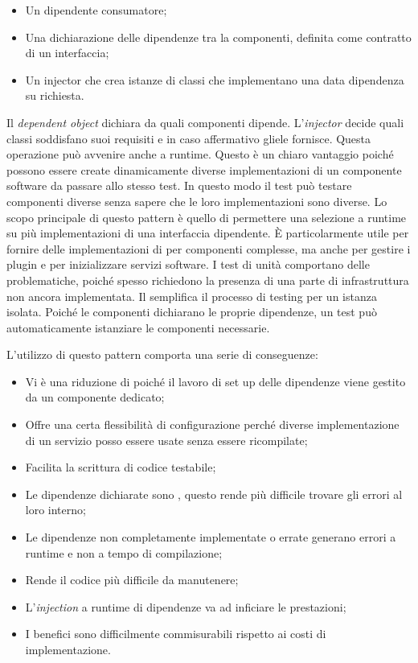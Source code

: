 \begin{itemize}
	\item Un dipendente consumatore;
	\item Una dichiarazione delle dipendenze tra la componenti, definita come contratto di un interfaccia;
	\item Un injector che crea istanze di classi che implementano una data dipendenza su richiesta.

\end{itemize}

Il \textit{dependent object} dichiara da quali componenti dipende. L'\textit{injector} decide quali classi soddisfano suoi requisiti e in caso affermativo gliele fornisce. Questa operazione può avvenire anche a runtime. Questo è un chiaro vantaggio poiché possono essere create dinamicamente diverse implementazioni di un componente software da passare allo stesso test. In questo modo il test può testare componenti diverse senza sapere che le loro implementazioni sono diverse.
Lo scopo principale di questo pattern è quello di permettere una selezione a runtime su più implementazioni di una interfaccia dipendente. È particolarmente utile per fornire delle implementazioni di  per componenti complesse, ma anche per gestire i plugin e per inizializzare servizi software. I test di unità comportano delle problematiche, poiché spesso richiedono la presenza di una parte di infrastruttura non ancora implementata. Il  semplifica il processo di testing per un istanza isolata. Poiché le componenti dichiarano le proprie dipendenze, un test può automaticamente istanziare le componenti necessarie.
	 
L'utilizzo di questo pattern comporta una serie di conseguenze:

\begin{itemize}

	\item Vi è una riduzione di  poiché il lavoro di set up delle dipendenze viene gestito da un componente dedicato;
	\item Offre una certa flessibilità di configurazione perché diverse implementazione di un servizio posso essere usate senza essere ricompilate;
	\item Facilita la scrittura di codice testabile;
	\item Le dipendenze dichiarate sono , questo rende più difficile trovare gli errori al loro interno;
	\item Le dipendenze non completamente implementate o errate generano errori a runtime e non a tempo di compilazione;
	\item Rende il codice più difficile da manutenere;
	\item L'\textit{injection} a runtime di dipendenze va ad inficiare le prestazioni;
	\item I benefici sono difficilmente commisurabili rispetto ai costi di implementazione.

\end{itemize}
		
